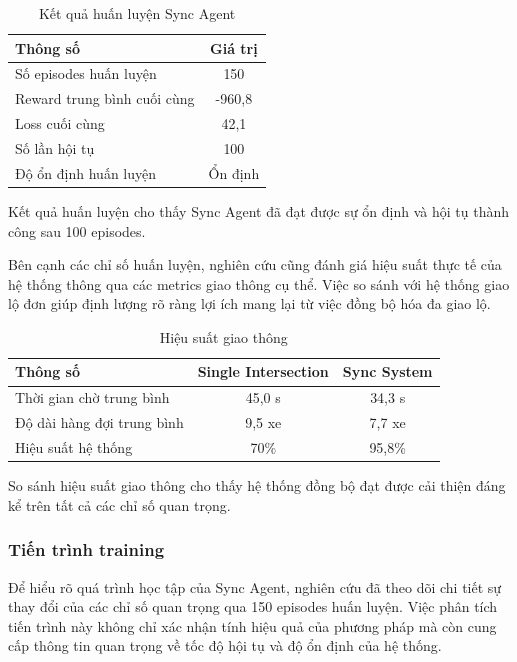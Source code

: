 \begin{table}[!htp]
    \centering
    \caption{Kết quả huấn luyện Sync Agent}
    \label{tab:sync_final_training}
    \begin{tabular}{@{}lc@{}}
        \toprule \textbf{Thông số}      & \textbf{Giá trị}       \\
        \midrule Số episodes huấn luyện     & 150                    \\
        Reward trung bình cuối cùng          & -960,8                 \\
        Loss cuối cùng                    & 42,1                   \\
        Số lần hội tụ           & 100                    \\
        Độ ổn định huấn luyện            & Ổn định                \\
        \bottomrule
    \end{tabular}
\end{table}

Kết quả huấn luyện cho thấy Sync Agent đã đạt được sự ổn định và hội tụ thành công sau 100 episodes.

Bên cạnh các chỉ số huấn luyện, nghiên cứu cũng đánh giá hiệu suất thực tế của hệ thống thông qua các metrics giao thông cụ thể. Việc so sánh với hệ thống giao lộ đơn giúp định lượng rõ ràng lợi ích mang lại từ việc đồng bộ hóa đa giao lộ.

\begin{table}[!htp]
    \centering
    \caption{Hiệu suất giao thông}
    \label{tab:sync_final_performance}
    \begin{tabular}{@{}lcc@{}}
        \toprule \textbf{Thông số} & \textbf{Single Intersection} & \textbf{Sync System} \\
        \midrule 
        Thời gian chờ trung bình & 45,0 s & 34,3 s \\
        Độ dài hàng đợi trung bình & 9,5 xe & 7,7 xe \\
        Hiệu suất hệ thống & 70\% & 95,8\% \\
        \bottomrule
    \end{tabular}
\end{table}

So sánh hiệu suất giao thông cho thấy hệ thống đồng bộ đạt được cải thiện đáng kể trên tất cả các chỉ số quan trọng.

\subsubsection{Tiến trình training}
Để hiểu rõ quá trình học tập của Sync Agent, nghiên cứu đã theo dõi chi tiết sự thay đổi của các chỉ số quan trọng qua 150 episodes huấn luyện. Việc phân tích tiến trình này không chỉ xác nhận tính hiệu quả của phương pháp mà còn cung cấp thông tin quan trọng về tốc độ hội tụ và độ ổn định của hệ thống.

